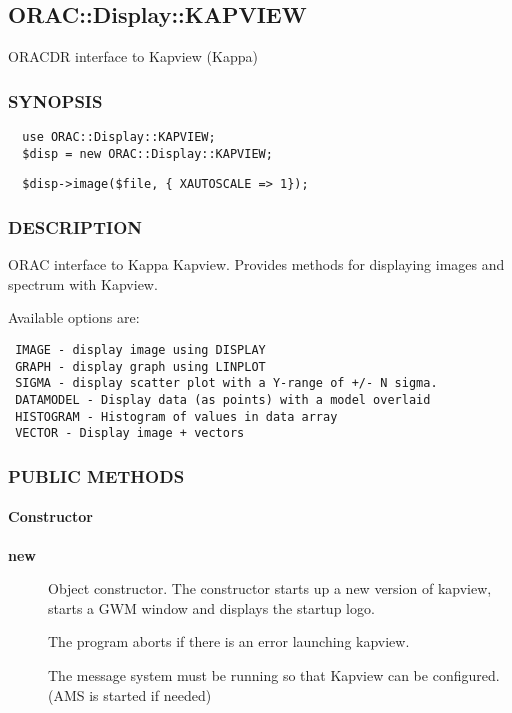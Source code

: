 \subsection{ORAC::Display::KAPVIEW\label{ORAC::Display::KAPVIEW}}

ORACDR interface to Kapview (Kappa)

\subsubsection*{SYNOPSIS\label{ORAC::Display::KAPVIEW_SYNOPSIS}}\begin{verbatim}
  use ORAC::Display::KAPVIEW;
  $disp = new ORAC::Display::KAPVIEW;
\end{verbatim}
\begin{verbatim}
  $disp->image($file, { XAUTOSCALE => 1});
\end{verbatim}
\subsubsection*{DESCRIPTION\label{ORAC::Display::KAPVIEW_DESCRIPTION}}

ORAC interface to Kappa Kapview. Provides methods for displaying images
and spectrum with Kapview.



Available options are:

\begin{verbatim}
 IMAGE - display image using DISPLAY
 GRAPH - display graph using LINPLOT
 SIGMA - display scatter plot with a Y-range of +/- N sigma.
 DATAMODEL - Display data (as points) with a model overlaid
 HISTOGRAM - Histogram of values in data array
 VECTOR - Display image + vectors
\end{verbatim}
\subsubsection*{PUBLIC METHODS\label{ORAC::Display::KAPVIEW_PUBLIC_METHODS}}\paragraph*{Constructor\label{ORAC::Display::KAPVIEW_Constructor}}\begin{description}
\item[\textbf{new}] \mbox{}

Object constructor. The constructor starts up a new version of kapview,
starts a GWM window and displays the startup logo.



The program aborts if there is an error launching kapview.



The message system must be running so that Kapview can be configured.
(AMS is started if needed)

\end{description}
